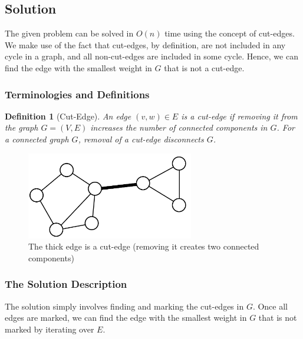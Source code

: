 \documentclass[12pt]{report}
\newtheorem{definition}{Definition}
\begin{document}
    \subsection*{Solution}
    The given problem can be solved in $O(n)$ time using the concept of cut-edges.
    We make use of the fact that cut-edges, by definition, are not included in any cycle in a graph, and all non-cut-edges are included in some cycle.
    Hence, we can find the edge with the smallest weight in $G$ that is not a cut-edge.

    \subsubsection*{Terminologies and Definitions}
    \begin{definition}[Cut-Edge]
        \label{def:cut-edge}
        An edge $(v, w) \in E$ is a cut-edge if removing it from the graph $G = (V, E)$ increases the number of connected components in $G$.
        For a connected graph $G$, removal of a cut-edge disconnects $G$.
    \end{definition}

    \begin{figure}[htp]
        \begin{center}
            \includegraphics[width=0.65\textwidth]{cut-edge.png}
        \end{center}
        \caption{The thick edge is a cut-edge (removing it creates two connected components)}
        \label{fig:cut-edge}
    \end{figure}

    \subsubsection*{The Solution Description}
    The solution simply involves finding and marking the cut-edges in $G$.
    Once all edges are marked, we can find the edge with the smallest weight in $G$ that is not marked by iterating over $E$.
\end{document}
